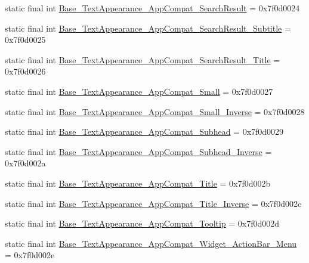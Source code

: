 \begin{DoxyCompactItemize}
\item 
static final int \mbox{\hyperlink{classandroid_1_1support_1_1design_1_1R_1_1style_a14e4224cdc4bb8704fd715e3af93873f}{Base\+\_\+\+Text\+Appearance\+\_\+\+App\+Compat\+\_\+\+Search\+Result}} = 0x7f0d0024
\item 
static final int \mbox{\hyperlink{classandroid_1_1support_1_1design_1_1R_1_1style_a37d10e72cc62481528c68beffbf407b7}{Base\+\_\+\+Text\+Appearance\+\_\+\+App\+Compat\+\_\+\+Search\+Result\+\_\+\+Subtitle}} = 0x7f0d0025
\item 
static final int \mbox{\hyperlink{classandroid_1_1support_1_1design_1_1R_1_1style_a3d7e0d19cd7ef91300834b97feba3511}{Base\+\_\+\+Text\+Appearance\+\_\+\+App\+Compat\+\_\+\+Search\+Result\+\_\+\+Title}} = 0x7f0d0026
\item 
static final int \mbox{\hyperlink{classandroid_1_1support_1_1design_1_1R_1_1style_aa05b5049493d12c414a207aeea21470f}{Base\+\_\+\+Text\+Appearance\+\_\+\+App\+Compat\+\_\+\+Small}} = 0x7f0d0027
\item 
static final int \mbox{\hyperlink{classandroid_1_1support_1_1design_1_1R_1_1style_a49b25eb5aeaf9b46ee955c20c5d74325}{Base\+\_\+\+Text\+Appearance\+\_\+\+App\+Compat\+\_\+\+Small\+\_\+\+Inverse}} = 0x7f0d0028
\item 
static final int \mbox{\hyperlink{classandroid_1_1support_1_1design_1_1R_1_1style_afdbc5e904b5c8a78ec4d8dcf8a976480}{Base\+\_\+\+Text\+Appearance\+\_\+\+App\+Compat\+\_\+\+Subhead}} = 0x7f0d0029
\item 
static final int \mbox{\hyperlink{classandroid_1_1support_1_1design_1_1R_1_1style_a391e6f44fa78e45e80ca3d5cf698c53d}{Base\+\_\+\+Text\+Appearance\+\_\+\+App\+Compat\+\_\+\+Subhead\+\_\+\+Inverse}} = 0x7f0d002a
\item 
static final int \mbox{\hyperlink{classandroid_1_1support_1_1design_1_1R_1_1style_aaeb1ba36694a5afaceb50327101c788c}{Base\+\_\+\+Text\+Appearance\+\_\+\+App\+Compat\+\_\+\+Title}} = 0x7f0d002b
\item 
static final int \mbox{\hyperlink{classandroid_1_1support_1_1design_1_1R_1_1style_a1128f32591ae2aade3e42c5d6f4c7c3d}{Base\+\_\+\+Text\+Appearance\+\_\+\+App\+Compat\+\_\+\+Title\+\_\+\+Inverse}} = 0x7f0d002c
\item 
static final int \mbox{\hyperlink{classandroid_1_1support_1_1design_1_1R_1_1style_a421c9f4e1903b79ba9abce614e664d98}{Base\+\_\+\+Text\+Appearance\+\_\+\+App\+Compat\+\_\+\+Tooltip}} = 0x7f0d002d
\item 
static final int \mbox{\hyperlink{classandroid_1_1support_1_1design_1_1R_1_1style_a631791e6b12ffaa53f20b6ff3b5b42d1}{Base\+\_\+\+Text\+Appearance\+\_\+\+App\+Compat\+\_\+\+Widget\+\_\+\+Action\+Bar\+\_\+\+Menu}} = 0x7f0d002e

\end{DoxyCompactItemize}
